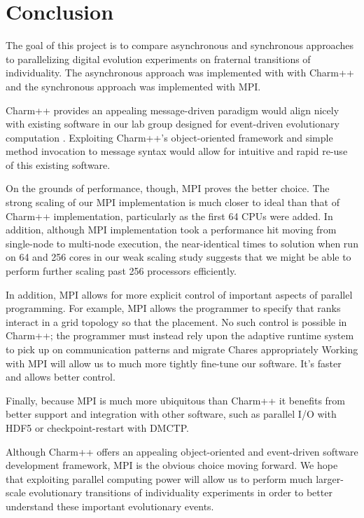 \section{Conclusion}

The goal of this project is to compare asynchronous and synchronous approaches to parallelizing digital evolution experiments on fraternal transitions of individuality.
The asynchronous approach was implemented with with Charm++ and the synchronous approach was implemented with MPI.

Charm++ provides an appealing message-driven paradigm would align nicely with existing software in our lab group designed for event-driven evolutionary computation \cite{lalejini2018evolving}.
Exploiting Charm++'s object-oriented framework and simple method invocation to message syntax would allow for intuitive and rapid re-use of this existing software.

On the grounds of performance, though, MPI proves the better choice.
The strong scaling of our MPI implementation is much closer to ideal than that of Charm++ implementation, particularly as the first 64 CPUs were added.
In addition, although MPI implementation took a performance hit moving from single-node to multi-node execution, the near-identical times to solution when run on 64 and 256 cores in our weak scaling study suggests that we might be able to perform further scaling past 256 processors efficiently.

In addition, MPI allows for more explicit control of important aspects of parallel programming.
For example, MPI allows the programmer to specify that ranks interact in a grid topology so that the placement.
No such control is possible in Charm++; the programmer must instead rely upon the adaptive runtime system to pick up on communication patterns and migrate Chares appropriately
Working with MPI will allow us to much more tightly fine-tune our software.
It's faster and allows better control.

Finally, because MPI is much more ubiquitous than Charm++ it benefits from better support and integration with other software, such as parallel I/O with HDF5 or checkpoint-restart with DMCTP.

Although Charm++ offers an appealing object-oriented and event-driven software development framework, MPI is the obvious choice moving forward.
We hope that exploiting parallel computing power will allow us to perform much larger-scale evolutionary transitions of individuality experiments in order to better understand these important evolutionary events.

